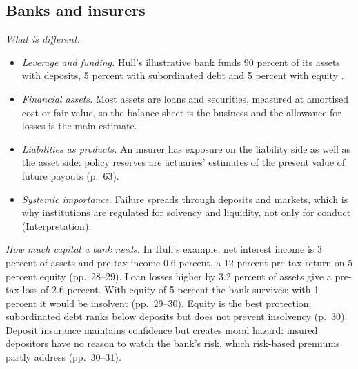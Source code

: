 \subsection{Banks and insurers}

\begin{qfdefinition}\label{def:financial-institution-features}
 \emph{What is different.}
\begin{itemize}
\item \emph{Leverage and funding.} Hull's illustrative bank funds 90 percent of its assets with deposits, 5 percent with subordinated debt and 5 percent with equity \citep[p.~28]{risk-management-financial-institutions-2023}.
\item \emph{Financial assets.} Most assets are loans and securities, measured at amortised cost or fair value, so the balance sheet is the business and the allowance for losses is the main estimate.
\item \emph{Liabilities as products.} An insurer has exposure on the liability side as well as the asset side: policy reserves are actuaries' estimates of the present value of future payouts (p.~63).
\item \emph{Systemic importance.} Failure spreads through deposits and markets, which is why institutions are regulated for solvency and liquidity, not only for conduct (Interpretation).
\end{itemize}

\emph{How much capital a bank needs.} In Hull's example, net interest income is 3 percent of assets and pre-tax income 0.6 percent, a 12 percent pre-tax return on 5 percent equity (pp.~28--29). Loan losses higher by 3.2 percent of assets give a pre-tax loss of 2.6 percent. With equity of 5 percent the bank survives; with 1 percent it would be insolvent (pp.~29--30). Equity is the best protection; subordinated debt ranks below deposits but does not prevent insolvency (p.~30). Deposit insurance maintains confidence but creates moral hazard: insured depositors have no reason to watch the bank's risk, which risk-based premiums partly address (pp.~30--31).


\end{qfdefinition}

